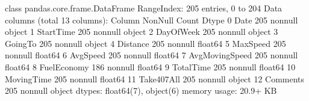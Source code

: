 \documentclass[letterpaper,10pt,english]{jupyterBook}
\begin{document}
\begin{sphinxVerbatim}[commandchars=\\\{\}]
\PYGZlt{}class \PYGZsq{}pandas.core.frame.DataFrame\PYGZsq{}\PYGZgt{}
RangeIndex: 205 entries, 0 to 204
Data columns (total 13 columns):
 \PYGZsh{}   Column          Non\PYGZhy{}Null Count  Dtype  
\PYGZhy{}\PYGZhy{}\PYGZhy{}  \PYGZhy{}\PYGZhy{}\PYGZhy{}\PYGZhy{}\PYGZhy{}\PYGZhy{}          \PYGZhy{}\PYGZhy{}\PYGZhy{}\PYGZhy{}\PYGZhy{}\PYGZhy{}\PYGZhy{}\PYGZhy{}\PYGZhy{}\PYGZhy{}\PYGZhy{}\PYGZhy{}\PYGZhy{}\PYGZhy{}  \PYGZhy{}\PYGZhy{}\PYGZhy{}\PYGZhy{}\PYGZhy{}  
 0   Date            205 non\PYGZhy{}null    object 
 1   StartTime       205 non\PYGZhy{}null    object 
 2   DayOfWeek       205 non\PYGZhy{}null    object 
 3   GoingTo         205 non\PYGZhy{}null    object 
 4   Distance        205 non\PYGZhy{}null    float64
 5   MaxSpeed        205 non\PYGZhy{}null    float64
 6   AvgSpeed        205 non\PYGZhy{}null    float64
 7   AvgMovingSpeed  205 non\PYGZhy{}null    float64
 8   FuelEconomy     186 non\PYGZhy{}null    float64
 9   TotalTime       205 non\PYGZhy{}null    float64
 10  MovingTime      205 non\PYGZhy{}null    float64
 11  Take407All      205 non\PYGZhy{}null    object 
 12  Comments        205 non\PYGZhy{}null    object 
dtypes: float64(7), object(6)
memory usage: 20.9+ KB
\end{sphinxVerbatim}

\begin{sphinxVerbatim}[commandchars=\\\{\}]
\PYG{p}{[}\PYG{p}{]}
\end{sphinxVerbatim}
\end{document}
